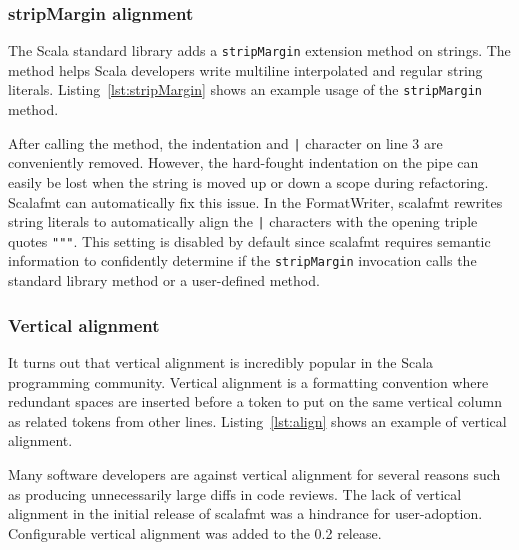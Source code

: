 \subsubsection{stripMargin alignment}
The Scala standard library adds a \texttt{stripMargin} extension method on strings.
The method helps Scala developers write multiline interpolated and regular string literals.
Listing~\ref{lst:stripMargin} shows an example usage of the \texttt{stripMargin} method.

After calling the method, the indentation and \texttt{|} character on line 3 are conveniently removed.
However, the hard-fought indentation on the pipe can easily be lost when the string is moved up or down a scope during refactoring.
Scalafmt can automatically fix this issue.
In the FormatWriter, scalafmt rewrites string literals to automatically align the \texttt{|} characters with the opening triple quotes \texttt{"""}.
This setting is disabled by default since scalafmt requires semantic information to confidently determine if the \texttt{stripMargin} invocation calls the standard library method or a user-defined method.

\subsubsection{Vertical alignment}
It turns out that vertical alignment is incredibly popular in the Scala programming community.
Vertical alignment is a formatting convention where redundant spaces are inserted before a token to put on the same vertical column as related tokens from other lines.
Listing~\ref{lst:align} shows an example of vertical alignment.

Many software developers are against vertical alignment for several reasons such as producing unnecessarily large diffs in code reviews.
The lack of vertical alignment in the initial release of scalafmt was a hindrance for user-adoption.
Configurable vertical alignment was added to the 0.2 release.

